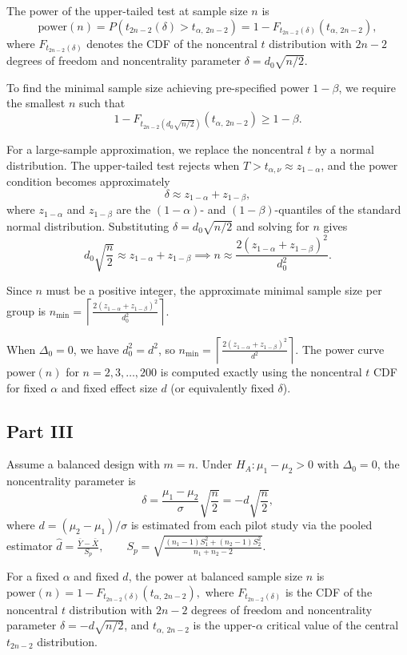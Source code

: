 \documentclass[letterpaper]{article}
\begin{document}
	The power of the upper-tailed test at sample size $n$ is
	$$\text{power}(n) = P(t_{2n-2}(\delta) > t_{\alpha,\,2n-2}) = 1 - F_{t_{2n-2}(\delta)}(t_{\alpha,\,2n-2}),$$
	where $F_{t_{2n-2}(\delta)}$ denotes the CDF of the noncentral $t$ distribution with $2n-2$ degrees of freedom and noncentrality parameter $\delta=d_0\sqrt{n/2}$.
	
	To find the minimal sample size achieving pre-specified power $1-\beta$, we require the smallest $n$ such that
	$$1 - F_{t_{2n-2}(d_0\sqrt{n/2})}(t_{\alpha,\,2n-2}) \geq 1-\beta.$$
	
	For a large-sample approximation, we replace the noncentral $t$ by a normal distribution. The upper-tailed test rejects when $T > t_{\alpha,\nu} \approx z_{1-\alpha}$, and the power condition becomes approximately
	$$\delta \approx z_{1-\alpha} + z_{1-\beta},$$
	where $z_{1-\alpha}$ and $z_{1-\beta}$ are the $(1-\alpha)$- and $(1-\beta)$-quantiles of the standard normal distribution. Substituting $\delta = d_0\sqrt{n/2}$ and solving for $n$ gives
	$$d_0\sqrt{\frac{n}{2}} \approx z_{1-\alpha}+z_{1-\beta} \implies n \approx \frac{2(z_{1-\alpha}+z_{1-\beta})^2}{d_0^2}.$$
	
	Since $n$ must be a positive integer, the approximate minimal sample size per group is
	$n_{\min} = \left\lceil \frac{2(z_{1-\alpha}+z_{1-\beta})^2}{d_0^2} \right\rceil.$
	
	When $\Delta_0=0$, we have $d_0^2=d^2$, so
	$n_{\min} = \left\lceil \frac{2(z_{1-\alpha}+z_{1-\beta})^2}{d^2} \right\rceil.$ The power curve $\text{power}(n)$ for $n=2,3,\dots,200$ is computed exactly using the noncentral $t$ CDF for fixed $\alpha$ and fixed effect size $d$ (or equivalently fixed $\delta$).
	
	\clearpage
	
	\subsection{Part III}
	
	
	Assume a balanced design with $m=n$. Under $H_A:\mu_1-\mu_2>0$ with $\Delta_0=0$, the noncentrality parameter is
	$$\delta = \frac{\mu_1-\mu_2}{\sigma}\sqrt{\frac{n}{2}} = -d\sqrt{\frac{n}{2}},$$
	where $d=(\mu_2-\mu_1)/\sigma$ is estimated from each pilot study via the pooled estimator
	$\hat d = \frac{\bar Y - \bar X}{S_p}, \qquad S_p = \sqrt{\frac{(n_1-1)S_1^2+(n_2-1)S_2^2}{n_1+n_2-2}}.$
	
	For a fixed $\alpha$ and fixed $d$, the power at balanced sample size $n$ is
	$\text{power}(n) = 1 - F_{t_{2n-2}(\delta)}(t_{\alpha,\,2n-2}),$
	where $F_{t_{2n-2}(\delta)}$ is the CDF of the noncentral $t$ distribution with $2n-2$ degrees of freedom and noncentrality parameter $\delta = -d\sqrt{n/2}$, and $t_{\alpha,\,2n-2}$ is the upper-$\alpha$ critical value of the central $t_{2n-2}$ distribution.
	
\end{document}

